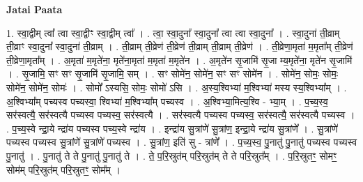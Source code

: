 \documentclass[17pt]{extarticle}
\begin{document}
\textbf{Jatai Paata} \newline

1. स्वा॒द्वीम् त्वा᳚ त्वा स्वा॒द्वीꣳ स्वा॒द्वीम् त्वा᳚ । . त्वा॒ स्वा॒दुना᳚ स्वा॒दुना᳚ त्वा त्वा स्वा॒दुना᳚ । . स्वा॒दुना॑ ती॒व्राम् ती॒व्राꣳ स्वा॒दुना᳚ स्वा॒दुना॑ ती॒व्राम् । . ती॒व्राम् ती॒व्रेण॑ ती॒व्रेण॑ ती॒व्राम् ती॒व्राम् ती॒व्रेण॑ । . ती॒व्रेणा॒मृता॑ म॒मृता᳚म् ती॒व्रेण॑ ती॒व्रेणा॒मृता᳚म् । . अ॒मृता॑ म॒मृते॑ना॒ मृते॑ना॒मृता॑ म॒मृता॑ म॒मृते॑न । . अ॒मृते॑न सृ॒जामि॑ सृ॒जा म्य॒मृते॑ना॒ मृते॑न सृ॒जामि॑ । . सृ॒जामि॒ सꣳ सꣳ सृ॒जामि॑ सृ॒जामि॒ सम् । . सꣳ सोमे॑न॒ सोमे॑न॒ सꣳ सꣳ सोमे॑न । . सोमे॑न॒ सोमः॒ सोमः॒ सोमे॑न॒ सोमे॑न॒ सोमः॑ । . सोमो᳚ ऽस्यसि॒ सोमः॒ सोमो॑ ऽसि । . अ॒स्य॒श्विभ्या॑ म॒श्विभ्या॑ मस्य स्य॒श्विभ्या᳚म् । . अ॒श्विभ्या᳚म् पच्यस्व पच्यस्वा॒ श्विभ्या॑ म॒श्विभ्या᳚म् पच्यस्व । . अ॒श्विभ्या॒मित्य॒श्वि - भ्या॒म् । . प॒च्य॒स्व॒ सर॑स्वत्यै॒ सर॑स्वत्यै पच्यस्व पच्यस्व॒ सर॑स्वत्यै । . सर॑स्वत्यै पच्यस्व पच्यस्व॒ सर॑स्वत्यै॒ सर॑स्वत्यै पच्यस्व । . प॒च्य॒स्वे न्द्रा॒ये न्द्रा॑य पच्यस्व पच्य॒स्वे न्द्रा॑य । . इन्द्रा॑य सु॒त्रांणे॑ सु॒त्रांण॒ इन्द्रा॒ये न्द्रा॑य सु॒त्रांणे᳚ । . सु॒त्रांणे॑ पच्यस्व पच्यस्व सु॒त्रांणे॑ सु॒त्रांणे॑ पच्यस्व । . सु॒त्रांण॒ इति॑ सु - त्रांणे᳚ । . प॒च्य॒स्व॒ पु॒नातु॑ पु॒नातु॑ पच्यस्व पच्यस्व पु॒नातु॑ । . पु॒नातु॑ ते ते पु॒नातु॑ पु॒नातु॑ ते । . ते॒ प॒रि॒स्रुत॑म् परि॒स्रुत॑म् ते ते परि॒स्रुत᳚म् । . प॒रि॒स्रुतꣳ॒॒ सोमꣳ॒॒ सोम॑म् परि॒स्रुत॑म् परि॒स्रुतꣳ॒॒ सोम᳚म् । \newline
\end{document}
